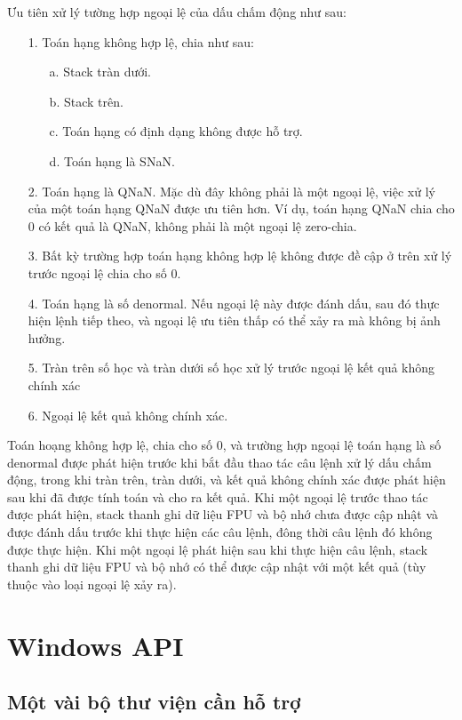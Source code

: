 		Ưu tiên xử lý tường hợp ngoại lệ của dấu chấm động như sau:
		\begin{itemize}
			\item[1.] Toán hạng không hợp lệ, chia như sau:
				\begin{itemize}
					\item[a.] Stack tràn dưới.
					\item[b.] Stack trên.
					\item[c.] Toán hạng có định dạng không được hỗ trợ.
					\item[d.] Toán hạng là SNaN.
				\end{itemize}
			\item[2.]		Toán hạng là QNaN. Mặc dù đây không phải là một ngoại lệ, việc xử lý của một toán hạng QNaN được ưu tiên hơn. Ví dụ, toán hạng QNaN chia cho 0 có kết quả là QNaN, không phải là một ngoại lệ zero-chia.
			\item[3.]		 Bất kỳ trường hợp toán hạng không hợp lệ không được đề cập ở trên xử lý trước ngoại lệ chia cho số 0.
			\item[4.]		Toán hạng là số denormal. Nếu ngoại lệ này được đánh dấu, sau đó thực hiện lệnh tiếp theo, và ngoại lệ ưu tiên thấp có thể xảy ra mà không bị ảnh hưởng.
			\item[5.]		Tràn trên số học và tràn dưới số học xử lý trước ngoại lệ kết quả không chính xác
			\item[6.]		Ngoại lệ kết quả không chính xác.
		\end{itemize}

	Toán hoạng không hợp lệ, chia cho số 0, và trường hợp ngoại lệ toán hạng là số denormal được phát hiện trước khi bắt đầu thao tác câu lệnh xử lý dấu chấm động, trong khi tràn trên, tràn dưới, và kết quả không chính xác được phát hiện sau khi đã được tính toán và cho ra kết quả. Khi một ngoại lệ trước thao tác được phát hiện, stack thanh ghi dữ liệu FPU và bộ nhớ chưa được cập nhật và được đánh dấu trước khi thực hiện các câu lệnh, đông thời câu lệnh đó không được thực hiện. Khi một ngoại lệ phát hiện sau khi thực hiện câu lệnh, stack thanh ghi dữ liệu FPU và bộ nhớ có thể được cập nhật với một kết quả (tùy thuộc vào loại ngoại lệ xảy ra).
	
\newpage
\section{Windows API}

	\subsection{Một vài bộ thư viện cần hỗ trợ}

